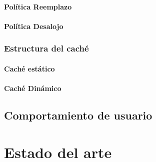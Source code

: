 \documentclass[12pt]{ociamthesis}  %
\begin{document}
\subsubsection{Política Reemplazo}
\subsubsection{Política Desalojo}

\subsection{Estructura del caché}
\subsubsection{Caché estático}
\subsubsection{Caché Dinámico}
\subsubsection{}


\section{Comportamiento de usuario}


\chapter{Estado del arte}



\end{document}
